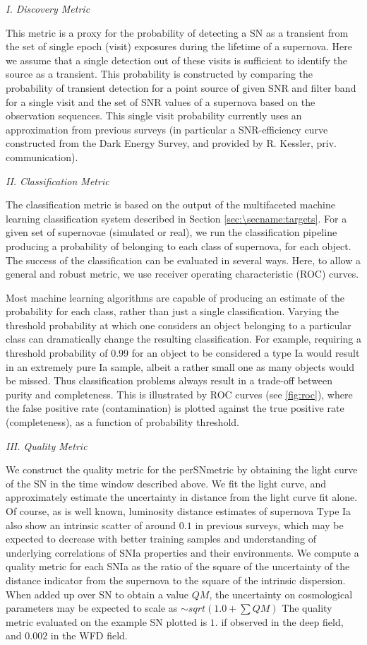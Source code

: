 \emph{I. Discovery Metric}

This metric is a proxy for the probability of detecting a SN as a
transient from the set of single epoch (visit) exposures during the
lifetime of a supernova. Here we assume that a single detection out of
these visits is sufficient to identify the source as a transient. This
probability is constructed by comparing the probability of transient
detection for a point source of given SNR and filter band for a single
visit and the set of SNR values of a supernova based on the observation
sequences. This single visit probability currently uses an approximation
from previous surveys (in particular a SNR-efficiency curve constructed
from the Dark Energy Survey, and provided by R. Kessler, priv.
communication).


\emph{II. Classification Metric}

The classification metric is based on the output of the multifaceted
machine learning classification system described in Section
\ref{sec:\secname:targets}. For a given set of supernovae (simulated or
real), we run the classification pipeline producing a probability of
belonging to each class of supernova, for each object. The success of
the classification can be evaluated in several ways. Here, to allow a
general and robust metric, we use receiver operating characteristic
(ROC) curves.

Most machine learning algorithms are capable of producing an estimate of
the probability for each class, rather than just a single
classification. Varying the threshold probability at which one considers
an object belonging to a particular class can dramatically change the
resulting classification. For example, requiring a threshold probability
of 0.99 for an object to be considered a type Ia would result in an
extremely pure Ia sample, albeit a rather small one as many objects
would be missed. Thus classification problems always result in a
trade-off between purity and completeness. This is illustrated by ROC
curves (see \autoref{fig:roc}), where the false positive rate
(contamination) is plotted against the true positive rate
(completeness), as a function of probability threshold.


\emph{III. Quality Metric}

We construct the quality metric for the perSNmetric by obtaining the
light curve of the SN in the time window described above. We fit the
light curve, and approximately estimate the uncertainty in distance from
the light curve fit alone. Of course, as is well known, luminosity
distance estimates of supernova Type Ia also show an intrinsic scatter
of around $0.1$ in previous surveys, which may be expected to decrease
with better training samples and understanding of underlying
correlations of SNIa properties and their environments. We compute a
quality metric for each SNIa as the ratio of the square of the
uncertainty of the distance indicator from the supernova to the square
of the intrinsic dispersion. When added up over SN to obtain a value
$QM$, the uncertainty on cosmological parameters may be expected to
scale as $\sim sqrt(1.0 + \sum QM)$ The quality metric evaluated on the
example SN plotted is $1.$ if observed in the deep field, and $0.002$ in
the WFD field.


